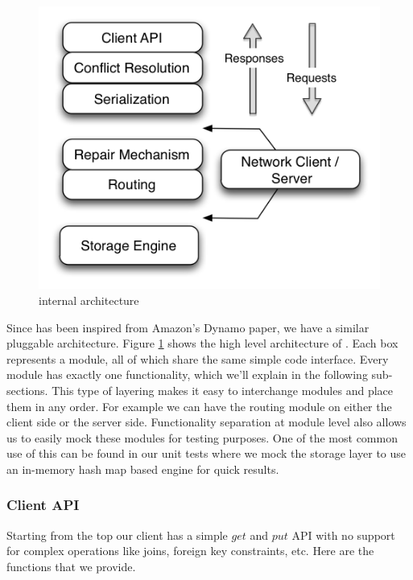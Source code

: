 \documentclass[10pt,twocolumn,preprint,nonatbib,numbers]{sigplanconf}
\begin{document}
\begin{figure}
  \centering
    \includegraphics[scale=0.45]{images/arch.png}
  \caption{\projectname{} internal architecture}
  \label{arch}
\end{figure}


Since \projectname{} has been inspired from Amazon's Dynamo paper, we have a similar pluggable architecture. Figure \ref{arch} shows the high level architecture of \projectname{}. Each box represents a module, all of which share the same simple code interface. Every module has exactly one functionality, which we'll explain in the following sub-sections. This type of layering makes it easy to interchange modules and place them in any order. For example we can have the routing module on either the client side or the server side. Functionality separation at module level also allows us to easily mock these modules for testing purposes. One of the most common use of this can be found in our unit tests where we mock the storage layer to use an in-memory hash map based engine for quick results.  


\subsubsection {Client API }  
\label{sec:system_architecture:system_components:client_api}

Starting from the top our client has a simple $get$ and $put$ API with no support for complex operations like joins, foreign key constraints, etc. Here are the functions that we provide. 
\end{document}
